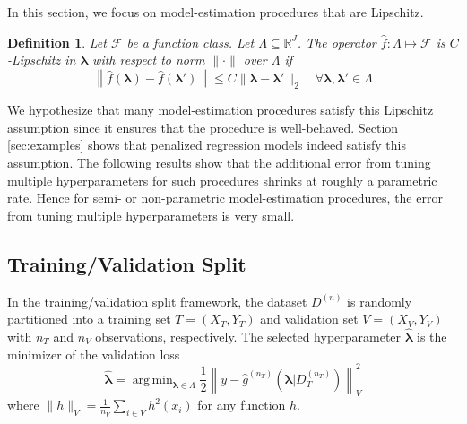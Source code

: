 \documentclass[12pt]{article}
\newtheorem{definition}{Definition}
\DeclareMathOperator*{\argmin}{arg\,min}
\begin{document}
In this section, we focus on model-estimation procedures that are Lipschitz.
\begin{definition}
	\label{def:smooth_funcs}
	Let $\mathcal{F}$ be a function class. Let $\Lambda \subseteq \mathbb{R}^J$.
	The operator $\hat{f}: \Lambda \mapsto \mathcal{F}$ is $C$-Lipschitz in $\boldsymbol{\lambda}$ with respect to norm $\| \cdot \|$ over $\Lambda$ if
	\begin{equation}
	\left \| \hat{f}(\boldsymbol \lambda) - \hat{f}(\boldsymbol \lambda ') \right \|
	\le
	C \| \boldsymbol \lambda - \boldsymbol \lambda' \|_2 
	\quad
	\forall \boldsymbol \lambda,\boldsymbol \lambda' \in \Lambda
	\label{eq:smooth_funcs}
	\end{equation}
\end{definition}
We hypothesize that many model-estimation procedures satisfy this Lipschitz assumption since it ensures that the procedure is well-behaved. Section \ref{sec:examples} shows that penalized regression models indeed satisfy this assumption. The following results show that the additional error from tuning multiple hyperparameters for such procedures shrinks at roughly a parametric rate. Hence for semi- or non-parametric model-estimation procedures, the error from tuning multiple hyperparameters is very small.

\subsection{Training/Validation Split}

In the training/validation split framework, the dataset $D^{(n)}$ is randomly partitioned into a training set $T = (X_T, Y_T)$ and validation set $V = (X_V, Y_V)$ with $n_T$ and $n_V$ observations, respectively. The selected hyperparameter $\hat{\boldsymbol{\lambda}}$ is the minimizer of the validation loss
\begin{equation}
\label{eq:train_val_lambda}
\hat{\boldsymbol \lambda} = \argmin_{\boldsymbol{\lambda} \in\Lambda} \frac{1}{2} \left \| y-\hat{g}^{(n_T)}( \boldsymbol \lambda | D_T^{(n_T)}) \right \|_{V}^{2}
\end{equation}
where $\| h \|_{V}=\frac{1}{n_V}\sum_{i\in V} h^2(x_i)$ for any function $h$. 
\end{document}
